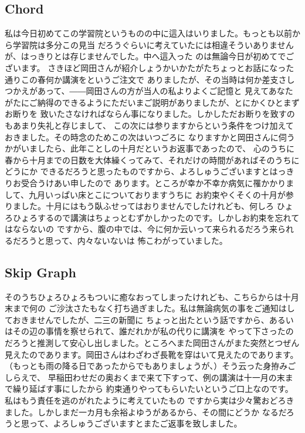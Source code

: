 \subsection{Chord}
  私は今日初めてこの学習院というものの中に這入はいりました。もっとも以前から学習院は多分この見当
  だろうぐらいに考えていたには相違そういありませんが、はっきりとは存じませんでした。中へ這入った
  のは無論今日が初めてでございます。
  さきほど岡田さんが紹介しょうかいかたがたちょっとお話になった通りこの春何か講演をというご注文で
  ありましたが、その当時は何か差支さしつかえがあって、――岡田さんの方が当人の私よりよくご記憶と
  見えてあなたがたにご納得のできるようにただいまご説明がありましたが、とにかくひとまずお断りを
  致いたさなければならん事になりました。しかしただお断りを致すのもあまり失礼と存じまして、
  この次には参りますからという条件をつけ加えておきました。その時念のためこの次はいつごろに
  なりますかと岡田さんに伺うかがいましたら、此年ことしの十月だというお返事であったので、
  心のうちに春から十月までの日数を大体繰くってみて、それだけの時間があればそのうちにどうにか
  できるだろうと思ったものですから、よろしゅうございますとはっきりお受合うけあい申したので
  あります。ところが幸か不幸か病気に罹かかりまして、九月いっぱい床とこについておりますうちに
  お約束やくそくの十月が参りました。十月にはもう臥ふせってはおりませんでしたけれども、何しろ
  ひょろひょろするので講演はちょっとむずかしかったのです。しかしお約束を忘れてはならないの
  ですから、腹の中では、今に何か云いって来られるだろう来られるだろうと思って、内々ないないは
  怖こわがっていました。

\subsection{Skip Graph}
  そのうちひょろひょろもついに癒なおってしまったけれども、こちらからは十月末まで何の
  ご沙汰さたもなく打ち過ぎました。私は無論病気の事をご通知はしておきませんでしたが、二三の新聞に
  ちょっと出たという話ですから、あるいはその辺の事情を察せられて、誰だれかが私の代りに講演を
  やって下さったのだろうと推測して安心し出しました。ところへまた岡田さんがまた突然とつぜん
  見えたのであります。岡田さんはわざわざ長靴を穿はいて見えたのであります。
  （もっとも雨の降る日であったからでもありましょうが、）そう云った身拵みごしらえで、
  早稲田わせだの奥おくまで来て下すって、例の講演は十一月の末まで繰り延ばす事にしたから
  約束通りやってもらいたいというご口上なのです。私はもう責任を逃のがれたように考えていたもの
  ですから実は少々驚おどろきました。しかしまだ一カ月も余裕よゆうがあるから、その間にどうか
  なるだろうと思って、よろしゅうございますとまたご返事を致しました。


